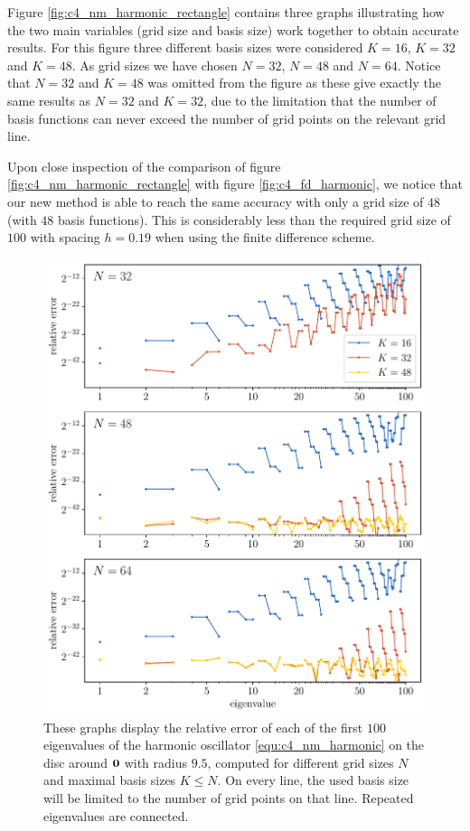 Figure \ref{fig:c4_nm_harmonic_rectangle} contains three graphs illustrating how the two main variables (grid size and basis size) work together to obtain accurate results. For this figure three different basis sizes were considered $K = 16$, $K = 32$ and $K = 48$. As grid sizes we have chosen $N = 32$, $N = 48$ and $N=64$. Notice that $N = 32$ and $K = 48$ was omitted from the figure as these give exactly the same results as $N = 32$ and $K = 32$, due to the limitation that the number of basis functions can never exceed the number of grid points on the relevant grid line.

Upon close inspection of the comparison of figure \ref{fig:c4_nm_harmonic_rectangle} with figure \ref{fig:c4_fd_harmonic}, we notice that our new method is able to reach the same accuracy with only a grid size of $48$ (with $48$ basis functions). This is considerably less than the required grid size of $100$ with spacing $h = 0.19$ when using the finite difference scheme.

\begin{figure}
    \begin{center}
        \includegraphics[width=\textwidth]{img/chapter4/nm_test_harmonic_disc.pdf}
    \end{center}
    \caption{These graphs display the relative error of each of the first $100$ eigenvalues of the harmonic oscillator \eqref{equ:c4_nm_harmonic} on the disc around $\vb{0}$ with radius $9.5$, computed for different grid sizes $N$ and maximal basis sizes $K \leq N$. On every line, the used basis size will be limited to the number of grid points on that line. Repeated eigenvalues are connected.}
    \label{fig:c4_nm_harmonic_disc}
\end{figure}

